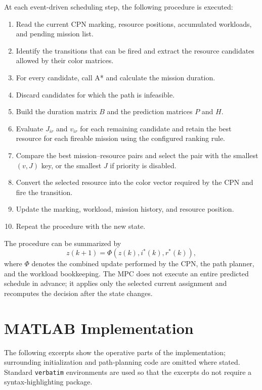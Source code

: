 At each event-driven scheduling step, the following procedure is executed:
\begin{enumerate}
	\item Read the current CPN marking, resource positions, accumulated
	workloads, and pending mission list.
	\item Identify the transitions that can be fired and extract the resource
	candidates allowed by their color matrices.
	\item For every candidate, call A* and calculate the mission duration.
	\item Discard candidates for which the path is infeasible.
	\item Build the duration matrix $B$ and the prediction matrices $P$ and
	$H$.
	\item Evaluate $J_{ir}$ and $v_{ir}$ for each remaining candidate and
	retain the best resource for each fireable mission using the configured
	ranking rule.
	\item Compare the best mission--resource pairs and select the pair with
	the smallest $(v,J)$ key, or the smallest $J$ if priority is disabled.
	\item Convert the selected resource into the color vector required by the
	CPN and fire the transition.
	\item Update the marking, workload, mission history, and resource
	position.
	\item Repeat the procedure with the new state.
\end{enumerate}

The procedure can be summarized by
\begin{equation}
	z(k+1) = \Phi\left(z(k),i^*(k),r^*(k)\right),
\end{equation}
where $\Phi$ denotes the combined update performed by the CPN, the path
planner, and the workload bookkeeping. The MPC does not execute an entire
predicted schedule in advance; it applies only the selected current
assignment and recomputes the decision after the state changes.

\section{MATLAB Implementation}
\label{sec:mpc-matlab-implementation}

The following excerpts show the operative parts of the implementation;
surrounding initialization and path-planning code are omitted where stated.
Standard \texttt{verbatim} environments are used so that the excerpts do not
require a syntax-highlighting package.

